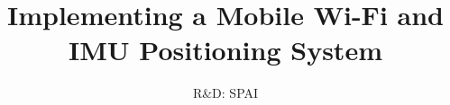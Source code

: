\documentclass[11pt,a4paper,twocolumn]{report}
\title{Implementing a Mobile Wi-Fi and IMU Positioning System}
\subtitle{R\&D: SPAI}
\begin{document}
	\preface
	
	
	
	
	
	
	
	


	\nocite{*}			%
	
	

    \appendix
    \appendixpage
	

%	

	\backcover
\end{document}
